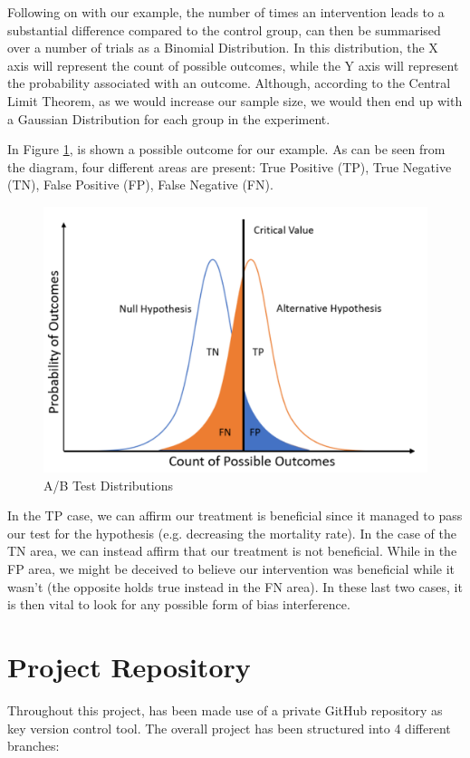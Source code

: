 \begin{appendices}
Following on with our example, the number of times an intervention leads to a substantial difference compared to the control group, can then be summarised over a number of trials as a Binomial Distribution. In this distribution, the X axis will represent the count of possible outcomes, while the Y axis will represent the probability associated with an outcome. Although, according to the Central Limit Theorem, as we would increase our sample size, we would then end up with a Gaussian Distribution for each group in the experiment. 

In Figure \ref{test_dist}, is shown a possible outcome for our example. As can be seen from the diagram, four different areas are present: True Positive (TP), True Negative (TN), False Positive (FP), False Negative (FN).
\vspace{-0.2cm}
\begin{figure}[ht!]%
    \centering
    \includegraphics[width=0.6\linewidth]{latex/images/abtest.pdf}
    \vspace{-0.2cm}
    \caption{A/B Test Distributions}
    \label{test_dist}
\end{figure}
\vspace{-0.6cm}

In the TP case, we can affirm our treatment is beneficial since it managed to pass our test for the hypothesis (e.g. decreasing the mortality rate). In the case of the TN area, we can instead affirm that our treatment is not beneficial. While in the FP area, we might be deceived to believe our intervention was beneficial while it wasn't (the opposite holds true instead in the FN area). In these last two cases, it is then vital to look for any possible form of bias interference.

\clearpage
\section{Project Repository}
\label{repo}
Throughout this project, has been made use of a private GitHub repository as key version control tool. The overall project has been structured into 4 different branches:


\end{appendices}
